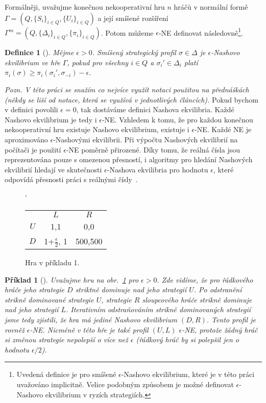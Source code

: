 \documentclass[a4paper,12pt]{article}
\newtheorem{definition}{Definice}
\newtheorem{example}{Příklad}
\begin{document}
Formálněji, uvažujme konečnou nekooperativní hru $n$ hráčů v normální formě $\Gamma = (Q, \{S_i\}_{i\in Q}, \{U_i\}_{i\in Q})$ a její smíšené rozšíření
$\Gamma^m = (Q, \{\Delta_i\}_{i\in Q}, \{\pi_i\}_{i\in Q})$. Potom můžeme $\epsilon$-NE definovat následovně\footnote{Uvedená definice je pro 
smíšené $\epsilon$-Nashovo ekvilibrium, které je v této práci uvažováno implicitně. Velice podobným způsobem je možné 
definovat $\epsilon$-Nashovo ekvilibrium v ryzích strategiích.}.

\begin{definition}[\cite{Leyton-Brown:2008:EGT:1481632}]
  Mějme $\epsilon > 0$. Smíšený strategický profil $\sigma \in\Delta$ je $\epsilon$-Nashovo ekvilibrium ve hře $\Gamma$, pokud
  pro všechny $i\in Q$ a $\sigma_i'\in\Delta_i$ platí $\pi_i(\sigma) \geq \pi_i(\sigma_i', \sigma_{-i}) - \epsilon$.
\end{definition}

\emph{Pozn. V této práci se snažím co nejvíce využít notaci použitou na přednáškách (někdy se liší od notace, která se využívá v jednotlivých článcích).}
Pokud bychom v definici povolili $\epsilon = 0$, tak dostáváme definici Nashova ekvilibria. Každé Nashovo ekvilibrium je tedy i 
$\epsilon$-NE. Vzhledem k tomu, že pro každou konečnou nekooperativní hru
existuje Nashovo ekvilibrium, existuje i $\epsilon$-NE. Každé NE je aproximováno $\epsilon$-Nashovými ekvilibrii. 
Při výpočtu Nashových ekvilibrií na počítači je použití $\epsilon$-NE poměrně přirozené. Díky tomu, že reálná čísla jsou reprezentována
pouze s omezenou přesností, i algoritmy pro hledání Nashových ekvilibrií hledají ve skutečnosti $\epsilon$-Nashova 
ekvilibria pro hodnotu $\epsilon$, které odpovídá přesnosti práci s reálnými čísly~\cite{Leyton-Brown:2008:EGT:1481632}.

\begin{figure}[h]
  \catcode`
  \centering
  \begin{tabular}{ c | c | c | }
  \multicolumn{1}{c}{} & \multicolumn{1}{c}{$L$} & \multicolumn{1}{c}{$R$} \\\cline{2-3}
  $U$ & 1,1 & 0,0 \\\cline{2-3}
  $D$ & 1+$\frac{\epsilon}{2}$, 1 & 500,500 \\\cline{2-3}
\end{tabular}
\caption{Hra v příkladu 1.}
\label{fig:game}
\end{figure}


\begin{example}[\cite{Leyton-Brown:2008:EGT:1481632}]\label{ex:1}
  Uvažujme hru na obr.~\ref{fig:game} pro $\epsilon > 0$. Zde vidíme, že pro řádkového hráče jeho strategie $D$ striktně dominuje nad jeho strategií $U$. Po odstranění
  strikně dominované strategie $U$, strategie $R$ sloupcového hráče strikně dominuje nad jeho strategií $L$. Iterativním odstraňováním
  strikně dominovaných strategií jsme tedy zjistili, že hra má jediné Nashovo ekvilibrium $(D,R)$. Tento profil je rovněž
  $\epsilon$-NE. Nicméně v této hře je také profil $(U, L)$ $\epsilon$-NE, protože žádný hráč si změnou strategie nepolepší o více než 
  $\epsilon$ (řádkový hráč by si polepšil jen o hodnotu $\epsilon/2$).
\end{example}
\end{document}
